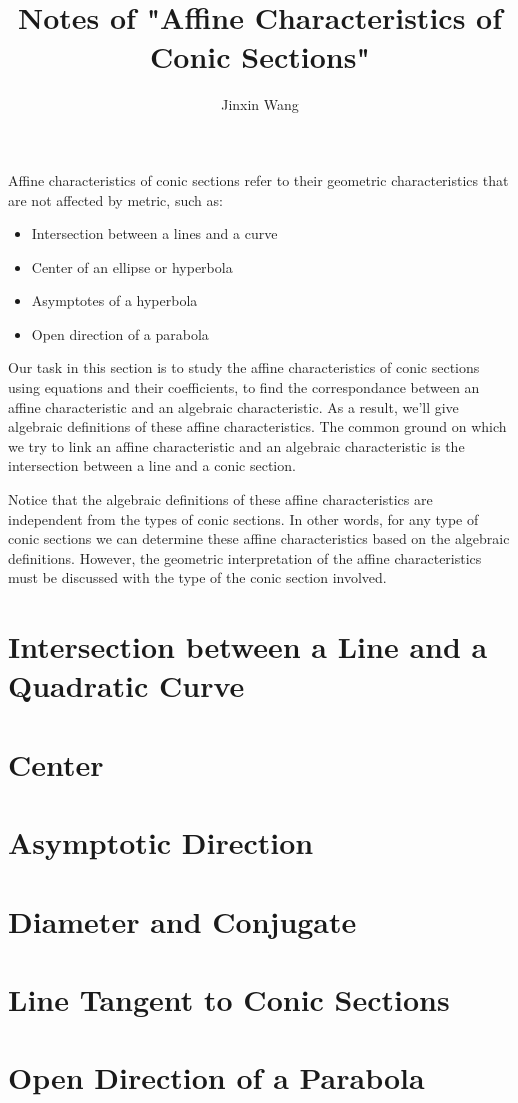 \documentclass[onecolumn]{ctexart}
\title{Notes of "Affine Characteristics of Conic Sections"}
\author{Jinxin Wang}
\date{}
\begin{document}
\maketitle

Affine characteristics of conic sections refer to their geometric 
characteristics that are not affected by metric, such as:
\begin{itemize}
  \item Intersection between a lines and a curve
  \item Center of an ellipse or hyperbola
  \item Asymptotes of a hyperbola
  \item Open direction of a parabola
\end{itemize}

Our task in this section is to study the affine characteristics of conic 
sections using equations and their coefficients, to find the correspondance 
between an affine characteristic and an algebraic characteristic. As a result, 
we'll give algebraic definitions of these affine characteristics. The common 
ground on which we try to link an affine characteristic and an algebraic 
characteristic is the intersection between a line and a conic section.

Notice that the algebraic definitions of these affine characteristics are 
independent from the types of conic sections. In other words, for any type of 
conic sections we can determine these affine characteristics based on the 
algebraic definitions. However, the geometric interpretation of the affine 
characteristics must be discussed with the type of the conic section involved.

\section{Intersection between a Line and a Quadratic Curve}

\section{Center}

\section{Asymptotic Direction}

\section{Diameter and Conjugate}

\section{Line Tangent to Conic Sections}

\section{Open Direction of a Parabola}
\end{document}

